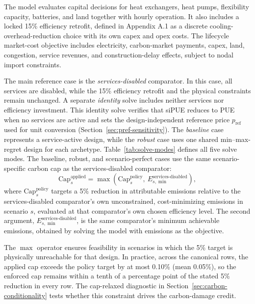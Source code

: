 \documentclass[preprint,12pt]{elsarticle}
\begin{document}
The model evaluates capital decisions for heat exchangers, heat pumps, flexibility capacity, batteries, and land together with hourly operation. It also includes a locked 15\% efficiency retrofit, defined in Appendix A.1 as a discrete cooling-overhead-reduction choice with its own capex and opex costs. The lifecycle market-cost objective includes electricity, carbon-market payments, capex, land, congestion, service revenues, and construction-delay effects, subject to nodal import constraints.

The main reference case is the \emph{services-disabled} comparator. In this case, all services are disabled, while the 15\% efficiency retrofit and the physical constraints remain unchanged. A separate \emph{identity} solve includes neither services nor efficiency investment. This identity solve verifies that siPUE reduces to PUE when no services are active and sets the design-independent reference price $p_{\text{ref}}$ used for unit conversion
(Section~\ref{sec:pref-sensitivity}). The \emph{baseline} case represents a service-active design, while the \emph{robust} case uses one shared min--max-regret design for each archetype. Table~\ref{tab:solve-modes} defines
all five solve modes. The baseline, robust, and scenario-perfect cases use the same scenario-specific carbon cap as the services-disabled comparator:
\begin{equation}
\text{Cap}^{\text{applied}}_s = \max\left(\text{Cap}^{\text{policy}}_s,\ E^{\text{services-disabled}}_{s,\min}\right),
\label{eq:carbon-cap-floor}
\end{equation}
where $\text{Cap}^{\text{policy}}_s$ targets a 5\% reduction in attributable emissions relative to the services-disabled comparator's own unconstrained, cost-minimizing emissions in scenario $s$, evaluated at that comparator's own chosen efficiency level. The second argument, $E^{\text{services-disabled}}_{s,\min}$, is the same comparator's minimum achievable emissions, obtained by solving the model with emissions as the objective.

The $\max$ operator ensures feasibility in scenarios in which the 5\% target is physically unreachable for that design. In practice, across the canonical rows, the applied cap exceeds the policy target by at most 0.10\% (mean 0.05\%), so the enforced cap remains within a tenth of a percentage point of the stated 5\% reduction in every row. The cap-relaxed diagnostic in Section~\ref{sec:carbon-conditionality} tests whether this constraint drives the carbon-damage credit.
\end{document}
